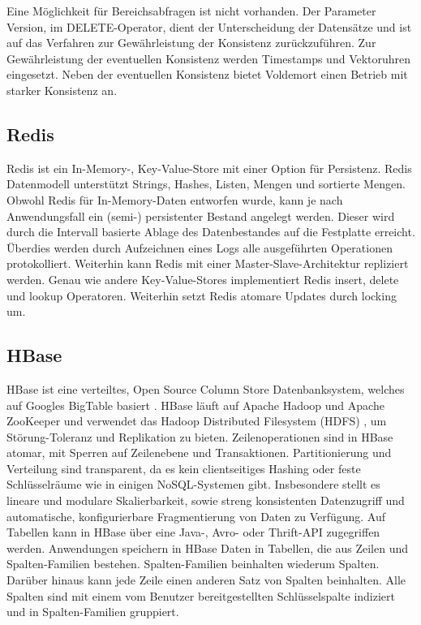 Eine Möglichkeit für Bereichsabfragen ist nicht vorhanden. Der Parameter Version, im DELETE-Operator, dient der Unterscheidung der Datensätze und ist auf das Verfahren zur Gewährleistung der Konsistenz zurückzuführen. Zur Gewährleistung der eventuellen Konsistenz werden Timestamps und Vektoruhren eingesetzt. Neben der eventuellen Konsistenz bietet Voldemort einen Betrieb mit starker Konsistenz an.       

\subsection{Redis}
\label{ch:AnalyseDatenbanken:sec:Datenbanken:subsec:Redis}

Redis \cite{red2013} ist ein In-Memory-, Key-Value-Store mit einer Option für Persistenz. Redis Datenmodell unterstützt Strings, Hashes, Listen, Mengen und sortierte Mengen. Obwohl Redis für In-Memory-Daten entworfen wurde, kann je nach Anwendungsfall ein (semi-) persistenter Bestand angelegt werden. Dieser wird durch die Intervall basierte Ablage des Datenbestandes auf die Festplatte erreicht. Überdies werden durch Aufzeichnen eines Logs alle ausgeführten Operationen protokolliert. Weiterhin kann Redis mit einer Master-Slave-Architektur repliziert werden. Genau wie andere Key-Value-Stores implementiert Redis insert, delete und lookup Operatoren. Weiterhin setzt Redis atomare Updates durch locking um. 

\subsection{HBase} 
\label{ch:AnalyseDatenbanken:sec:Datenbanken:subsec:HBase}

HBase ist eine verteiltes, Open Source Column Store Datenbanksystem, welches auf Googles BigTable basiert \cite{Chang:2006:BDS:1267308.1267323}. HBase läuft auf Apache Hadoop und Apache ZooKeeper  \cite{Hunt:2010:ZWC:1855840.1855851} und verwendet das Hadoop Distributed Filesystem (HDFS) \cite{Shvachko:2010:HDF:1913798.1914427}, um Störung-Toleranz und Replikation zu bieten. Zeilenoperationen sind in HBase atomar, mit Sperren auf Zeilenebene und Transaktionen. Partitionierung und Verteilung sind transparent, da es kein clientseitiges Hashing oder feste Schlüsselräume wie in einigen NoSQL-Systemen gibt. 
Insbesondere stellt es lineare und modulare Skalierbarkeit, sowie streng konsistenten Datenzugriff und automatische, konfigurierbare Fragmentierung von Daten zu Verfügung. Auf Tabellen kann in HBase über eine Java-, Avro- oder Thrift-API zugegriffen werden. Anwendungen speichern in HBase Daten in Tabellen, die aus Zeilen und Spalten-Familien bestehen. Spalten-Familien beinhalten wiederum Spalten. Darüber hinaus kann jede Zeile einen anderen Satz von Spalten beinhalten. Alle Spalten sind mit einem vom Benutzer bereitgestellten Schlüsselspalte indiziert und in Spalten-Familien gruppiert.

